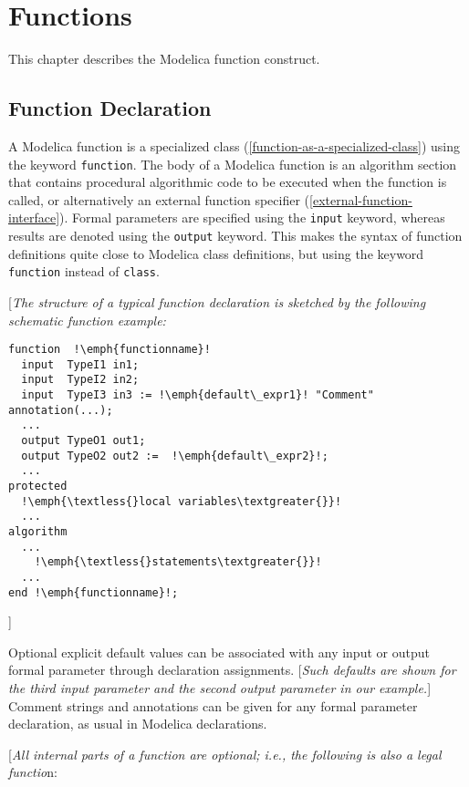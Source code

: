\chapter{Functions}

This chapter describes the Modelica function construct.

\section{Function Declaration}

A Modelica function is a specialized class (\autoref{function-as-a-specialized-class}) using the
keyword \lstinline!function!. The body of a Modelica function is an algorithm
section that contains procedural algorithmic code to be executed when
the function is called, or alternatively an external function specifier
(\autoref{external-function-interface}). Formal parameters are specified using the \lstinline!input! keyword,
whereas results are denoted using the \lstinline!output! keyword. This makes the
syntax of function definitions quite close to Modelica class
definitions, but using the keyword \lstinline!function! instead of \lstinline!class!.

{[}\emph{The structure of a typical function declaration is sketched by
the following schematic function example:}

\begin{lstlisting}[language=modelica,escapechar=!]
function  !\emph{functionname}!
  input  TypeI1 in1;
  input  TypeI2 in2;
  input  TypeI3 in3 := !\emph{default\_expr1}! "Comment" annotation(...);
  ...
  output TypeO1 out1;
  output TypeO2 out2 :=  !\emph{default\_expr2}!;
  ...
protected
  !\emph{\textless{}local variables\textgreater{}}!
  ...
algorithm
  ...
    !\emph{\textless{}statements\textgreater{}}!
  ...
end !\emph{functionname}!;
\end{lstlisting}

{]}

Optional explicit default values can be associated with any input or
output formal parameter through declaration assignments. {[}\emph{Such
defaults are shown for the third input parameter and the second output
parameter in our example.}{]} Comment strings and annotations can be
given for any formal parameter declaration, as usual in Modelica
declarations.

{[}\emph{All internal parts of a function are optional; i.e., the
following is also a legal functio}n:

